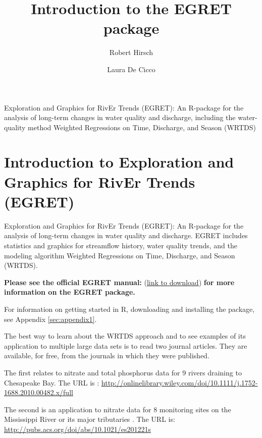 \documentclass[a4paper,11pt]{article}\usepackage[]{graphicx}\usepackage[]{color}
\begin{document}
\title{Introduction to the EGRET package}
\author[1]{Robert Hirsch}
\author[1]{Laura De Cicco}

\maketitle

Exploration and Graphics for RivEr Trends (EGRET): An R-package for the analysis of long-term changes in water quality and discharge, including the water-quality method Weighted Regressions on Time, Discharge, and Season (WRTDS)

\tableofcontents

\section{Introduction to Exploration and Graphics for RivEr Trends (EGRET)}

Exploration and Graphics for RivEr Trends (EGRET): An R-package for the analysis of long-term changes in water quality and discharge. EGRET includes statistics and graphics for streamflow history, water quality trends, and the modeling algorithm Weighted Regressions on Time, Discharge, and Season (WRTDS). 


\textbf{Please see the official EGRET manual:}
(\href{https://github.com/USGS-R/EGRET/raw/Documentation/EGRET%2Bmanual_4.doc}{link to download}) 
\textbf{for more information on the EGRET package.}

For information on getting started in R, downloading and installing the package, see Appendix \ref{sec:appendix1}.

The best way to learn about the WRTDS approach and to see examples of its application to multiple large data sets is to read two journal articles.  They are available, for free, from the journals in which they were published.

The first relates to nitrate and total phosphorus data for 9 rivers draining to Chesapeake Bay.  The URL is \cite{HirschII}: 
\url{http://onlinelibrary.wiley.com/doi/10.1111/j.1752-1688.2010.00482.x/full}

The second is an application  to nitrate data for 8 monitoring sites on the Mississippi River or its major tributaries \cite{HirschIII}.  The URL is: \url{http://pubs.acs.org/doi/abs/10.1021/es201221s}
\end{document}
